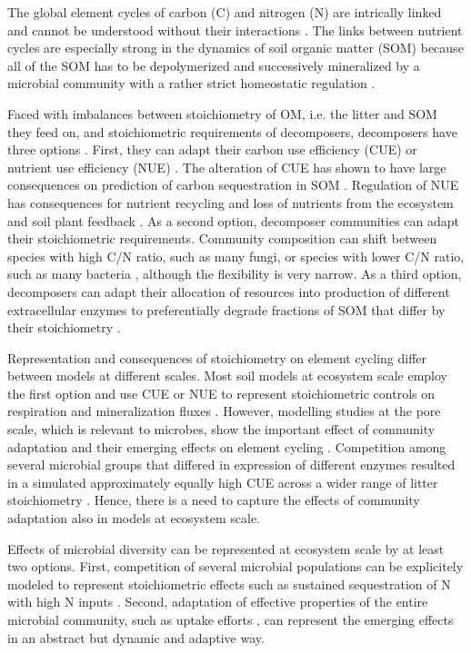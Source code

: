
\introduction 
The global element cycles of carbon (C) and nitrogen (N) are intrically linked
and cannot be understood without their interactions 
\citep{Thornton07,Janssens10, Zaehle11}. 
The links between nutrient cycles are especially strong
in the dynamics of soil organic matter (SOM) because all of the SOM has to be
depolymerized and successively mineralized by a microbial community with a
rather strict homeostatic regulation \citep{Sterner02, Zechmeister15}.

Faced with imbalances between stoichiometry of OM, i.e. the litter and SOM they
feed on, and stoichiometric requirements of decomposers, decomposers have three
options \citep{Mooshammer14}.
First, they can adapt their carbon use efficiency (CUE) or nutrient use
efficiency (NUE) \citep{Sinsabaugh13}. The alteration of CUE has shown to have
large consequences on prediction of carbon sequestration in SOM
\citep{Allison14a, Wieder13}.
Regulation of NUE has consequences for nutrient recycling and loss of nutrients
from the ecosystem \citep{Mooshammer14a} and soil plant feedback
\citep{Rastetter11}.
As a second option, decomposer communities can adapt their stoichiometric
requirements. Community composition can shift between species with high C/N
ratio, such as many fungi, or species with lower C/N ratio, such as many
bacteria \citep{Cleveland07, Xu13}, although the flexibility is very narrow.
As a third option, decomposers can adapt their allocation of resources into
production of different extracellular enzymes to preferentially degrade
fractions of SOM that differ by their stoichiometry \citep{Moorhead12}.

Representation and consequences of stoichiometry on element cycling differ
between models at different scales. Most soil models at ecosystem scale
employ the first option and use CUE or NUE to represent stoichiometric controls
on respiration and mineralization fluxes \citep{Manzoni08}. However, modelling
studies at the pore scale, which is relevant to microbes, show the
important effect of community adaptation and their emerging effects on element cycling
\citep{Allison05, Resat11, Wang13}. Competition among several
microbial groups that differed in expression of different enzymes resulted in a
simulated approximately equally high CUE across a wider range of litter
stoichiometry \citep{Kaiser14}. Hence, there is a need to capture the effects of community
adaptation also in models at ecosystem scale. 

Effects of microbial diversity can be represented at ecosystem scale by at least
two options. First, competition of several microbial populations can be
explicitely modeled to represent stoichiometric effects such as sustained
sequestration of N with high N inputs \citep{Perveen14}.
Second, adaptation of effective properties of the entire microbial community,
such as uptake efforts \citep{Rastetter97, Rastetter11}, can represent the
emerging effects in an abstract but dynamic and adaptive way.

